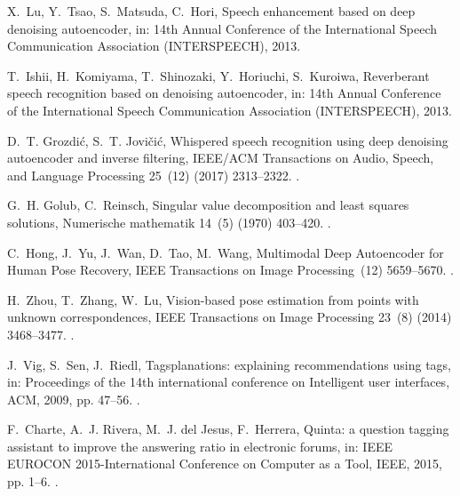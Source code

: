 \documentclass[preprint,5p,compress]{elsarticle}
\begin{document}
\begin{thebibliography}{100}
X.~Lu, Y.~Tsao, S.~Matsuda, C.~Hori, Speech enhancement based on deep denoising
  autoencoder, in: 14th Annual Conference of the International Speech
  Communication Association ({INTERSPEECH}), 2013.

T.~Ishii, H.~Komiyama, T.~Shinozaki, Y.~Horiuchi, S.~Kuroiwa, Reverberant
  speech recognition based on denoising autoencoder, in: 14th Annual Conference
  of the International Speech Communication Association ({INTERSPEECH}), 2013.

D.~T. Grozdi{\'c}, S.~T. Jovi{\v{c}}i{\'c}, Whispered speech recognition using
  deep denoising autoencoder and inverse filtering, IEEE/ACM Transactions on
  Audio, Speech, and Language Processing 25~(12) (2017) 2313--2322.
\newblock \href {http://dx.doi.org/10.1109/TASLP.2017.2738559}
  {}.

G.~H. Golub, C.~Reinsch, Singular value decomposition and least squares
  solutions, Numerische mathematik 14~(5) (1970) 403--420.
\newblock \href {http://dx.doi.org/10.1007/BF02163027}
  {}.

C.~Hong, J.~Yu, J.~Wan, D.~Tao, M.~Wang, {Multimodal Deep Autoencoder for Human
  Pose Recovery}, IEEE Transactions on Image Processing~(12)  5659--5670.
\newblock \href {http://dx.doi.org/10.1109/TIP.2015.2487860}
  {}.

H.~Zhou, T.~Zhang, W.~Lu, Vision-based pose estimation from points with unknown
  correspondences, IEEE Transactions on Image Processing 23~(8) (2014)
  3468--3477.
\newblock \href {http://dx.doi.org/10.1109/TIP.2014.2329765}
  {}.

J.~Vig, S.~Sen, J.~Riedl, Tagsplanations: explaining recommendations using
  tags, in: Proceedings of the 14th international conference on Intelligent
  user interfaces, ACM, 2009, pp. 47--56.
\newblock \href {http://dx.doi.org/10.1145/1502650.1502661}
  {}.

F.~Charte, A.~J. Rivera, M.~J. del Jesus, F.~Herrera, Quinta: a question
  tagging assistant to improve the answering ratio in electronic forums, in:
  IEEE EUROCON 2015-International Conference on Computer as a Tool, IEEE, 2015,
  pp. 1--6.
\newblock \href {http://dx.doi.org/10.1109/EUROCON.2015.7313677}
  {}.


\end{thebibliography}
\end{document}
